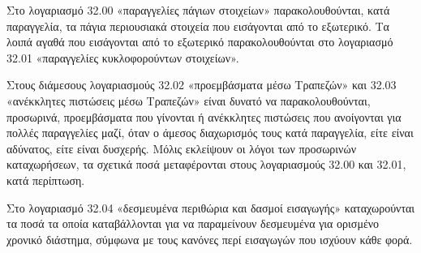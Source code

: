 \documentclass[A4,10pt,greek]{book}
\begin{document}
Στο λογαριασμό 32.00 «παραγγελίες πάγιων στοιχείων» παρακολουθούνται, κατά παραγγελία, τα πάγια περιουσιακά στοιχεία που εισάγονται από το εξωτερικό. Τα λοιπά αγαθά που εισάγονται από το εξωτερικό παρακολουθούνται στο λογαριασμό 32.01 «παραγγελίες κυκλοφορούντων στοιχείων».

Στους διάμεσους λογαριασμούς 32.02 «προεμβάσματα μέσω Τραπεζών» και 32.03 «ανέκκλητες πιστώσεις μέσω Τραπεζών» είναι δυνατό να παρακολουθούνται, προσωρινά, προεμβάσματα που γίνονται ή ανέκκλητες πιστώσεις που ανοίγονται για πολλές παραγγελίες μαζί, όταν ο άμεσος διαχωρισμός τους κατά παραγγελία, είτε είναι αδύνατος, είτε είναι δυσχερής. Μόλις εκλείψουν οι λόγοι των προσωρινών καταχωρήσεων, τα σχετικά ποσά μεταφέρονται στους λογαριασμούς 32.00 και 32.01, κατά περίπτωση.

Στο λογαριασμό 32.04 «δεσμευμένα περιθώρια και δασμοί εισαγωγής» καταχωρούνται τα ποσά τα οποία καταβάλλονται για να παραμείνουν δεσμευμένα για ορισμένο χρονικό διάστημα, σύμφωνα με τους κανόνες περί εισαγωγών που ισχύουν κάθε φορά.
\end{document}
